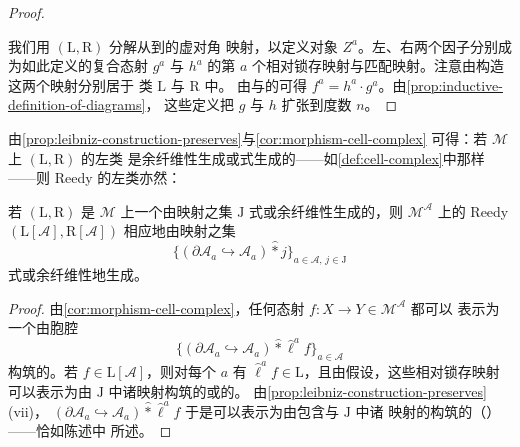 \begin{proof}
\begin{center}
\end{center}
我们用 $(\mathrm{L},\mathrm{R})$ 分解从\trPushout{}到\trPullback{}的虚对角
映射，以定义对象 $Z^{a}$。左、右两个因子分别成为如此定义的复合态射 $g^{a}$
与 $h^{a}$ 的第 $a$ 个相对锁存映射与匹配映射。注意由构造这两个映射分别居于
类 $\mathrm{L}$ 与 $\mathrm{R}$ 中。
由\trPushout{}与\trPullback{}的\trUniversalProperty{}可得
$f^{a}=h^{a}\cdot g^{a}$。由\cref{prop:inductive-definition-of-diagrams}，
这些定义把\trNaturalTransformation{} $g$ 与 $h$ 扩张到度数 $n$。
\end{proof}

由\cref{prop:leibniz-construction-preserves}与\cref{cor:morphism-cell-complex} 可得：若
$\mathcal{M}$ 上\trWeakFactorizationSystem{} $(\mathrm{L},\mathrm{R})$ 的左类
是余纤维性生成或\trCell{}式生成的——如\cref{def:cell-complex}中那样——则
Reedy \trWeakFactorizationSystem{}的左类亦然：

\begin{proposition}\label{prop:reedy-cellularly-generated}
若 $(\mathrm{L},\mathrm{R})$ 是 $\mathcal{M}$ 上一个由映射之集 $\mathrm{J}$
\trCell{}式或余纤维性生成的\trWeakFactorizationSystem，则 $\mathcal{M}^{\mathcal{A}}$
上的 Reedy \trWeakFactorizationSystem{} $(\mathrm{L}[\mathcal{A}],\mathrm{R}[\mathcal{A}])$ 相应地由映射之集
\[
\{(\partial\mathcal{A}_a\hookrightarrow\mathcal{A}_a)\mathbin{\widehat{\ast}} j
\}_{a\in\mathcal{A},\,j\in\mathrm{J}}
\]
\trCell{}式或余纤维性地生成。
\end{proposition}

\begin{proof}
由\cref{cor:morphism-cell-complex}，任何态射 $f\colon X\to Y\in\mathcal{M}^{\mathcal{A}}$ 都可以
表示为一个由胞腔
\[
\{(\partial\mathcal{A}_a\hookrightarrow\mathcal{A}_a)\mathbin{\widehat{\ast}}
\widehat{\ell}^{a}f\}_{a\in\mathcal{A}}
\]
构筑的\trCellComplex。若 $f\in\mathrm{L}[\mathcal{A}]$，则对每个 $a$ 有
$\widehat{\ell}^{a}f\in\mathrm{L}$，且由假设，这些相对锁存映射可以表示为由
$\mathrm{J}$ 中诸映射构筑的\trCellComplex{}或\trCellComplex{}的\trRetract。
由\cref{prop:leibniz-construction-preserves}(vii)，\trLeibnizTensor{}
$(\partial\mathcal{A}_a\hookrightarrow\mathcal{A}_a)\mathbin{\widehat{\ast}}\widehat{\ell}^{a}f$ 于是可以表示为由\trBoundary{}包含与 $\mathrm{J}$ 中诸
映射的\trLeibnizTensor{}构筑的（\trRetract{}）\trCellComplex——恰如陈述中
所述。
\end{proof}

